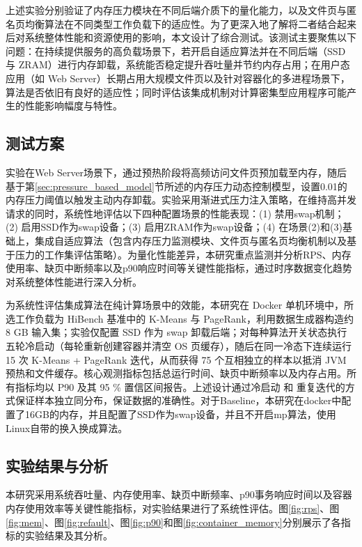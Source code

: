 上述实验分别验证了内存压力模块在不同后端介质下的量化能力，以及文件页与匿名页均衡算法在不同类型工作负载下的适应性。为了更深入地了解将二者结合起来后对系统整体性能和资源使用的影响，本文设计了综合测试。该测试主要聚焦以下问题：在持续提供服务的高负载场景下，若开启自适应算法并在不同后端（SSD 与 ZRAM）进行内存卸载，系统能否稳定提升吞吐量并节约内存占用；在用户态应用（如 Web Server）长期占用大规模文件页以及针对容器化的多进程场景下，算法是否依旧有良好的适应性；同时评估该集成机制对计算密集型应用程序可能产生的性能影响幅度与特性。

\subsection{测试方案}

实验在Web Server场景下，通过预热阶段将高频访问文件页预加载至内存，随后基于第\ref{sec:pressure_based_model}节所述的内存压力动态控制模型，设置0.01的内存压力阈值以触发主动内存卸载。实验采用渐进式压力注入策略，在维持高并发请求的同时，系统性地评估以下四种配置场景的性能表现：(1) 禁用swap机制；(2) 启用SSD作为swap设备；(3) 启用ZRAM作为swap设备；(4) 在场景(2)和(3)基础上，集成自适应算法（包含内存压力监测模块、文件页与匿名页均衡机制以及基于压力的工作集评估策略）。为量化性能差异，本研究重点监测并分析RPS、内存使用率、缺页中断频率以及p90响应时间等关键性能指标，通过时序数据变化趋势对系统整体性能进行深入分析。

为系统性评估集成算法在纯计算场景中的效能，本研究在 Docker 单机环境中，所选工作负载为 HiBench 基准中的 K-Means 与 PageRank，利用数据生成器构造约 8 GB 输入集；实验仅配置 SSD 作为 swap 卸载后端；对每种算法开关状态执行五轮冷启动（每轮重新创建容器并清空 OS 页缓存），随后在同一冷态下连续运行 15 次 K-Means + PageRank 迭代，从而获得 75 个互相独立的样本以抵消 JVM 预热和文件缓存。核心观测指标包括总运行时间、缺页中断频率以及内存占用。所有指标均以 P90 及其 95 \% 置信区间报告。上述设计通过冷启动 和 重复迭代的方式保证样本独立同分布，保证数据的准确性。对于Baseline，本研究在docker中配置了16GB的内存，并且配置了SSD作为swap设备，并且不开启mp算法，使用Linux自带的换入换成算法。


\subsection{实验结果与分析}
\label{sec:test_result}
本研究采用系统吞吐量、内存使用率、缺页中断频率、p90事务响应时间以及容器内存使用效率等关键性能指标，对实验结果进行了系统性评估。图\ref{fig:rps}、图\ref{fig:mem}、图\ref{fig:refault}、图\ref{fig:p90}和图\ref{fig:container_memory}分别展示了各指标的实验结果及其分析。

